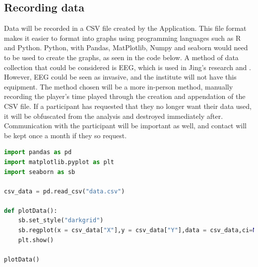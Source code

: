 \documentclass[conference]{IEEEtran}
\begin{document}
\subsection{Recording data}
Data will be recorded in a CSV file created by the Application. This file format makes it easier to format into graphs using programming languages such as R and Python. Python, with Pandas, MatPlotlib, Numpy and seaborn would need to be used to create the graphs, as seen in the code below. A method of data collection that could be considered is EEG, which is used in Jing's research \cite{Jing2024} and \cite{Ruqeyya2022}. However, EEG could be seen as invasive, and the institute will not have this equipment. The method chosen will be a more in-person method, manually recording the player's time played through the creation and appendation of the CSV file. If a participant has requested that they no longer want their data used, it will be obfuscated from the analysis and destroyed immediately after. Communication with the participant will be important as well, and contact will be kept once a month if they so request.\\


%

\begin{lstlisting}[language=Python, caption=Python Script for generating Graphs,captionpos=b]
import pandas as pd
import matplotlib.pyplot as plt
import seaborn as sb

csv_data = pd.read_csv("data.csv")

def plotData():
    sb.set_style("darkgrid")
    sb.regplot(x = csv_data["X"],y = csv_data["Y"],data = csv_data,ci=None)
    plt.show()

plotData()
\end{lstlisting}
\end{document}
